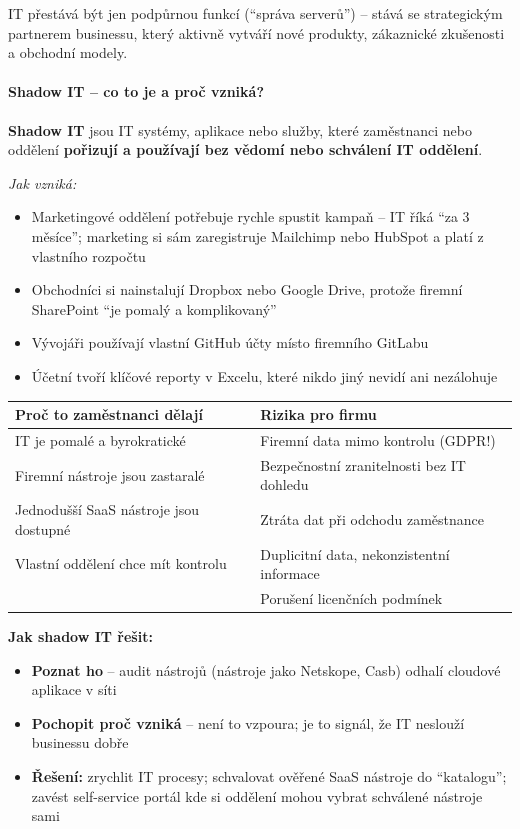 IT přestává být jen podpůrnou funkcí (``správa serverů'') -- stává se strategickým partnerem businessu,
který aktivně vytváří nové produkty, zákaznické zkušenosti a obchodní modely.

\paragraph{Shadow IT -- co to je a proč vzniká?}

\textbf{Shadow IT} jsou IT systémy, aplikace nebo služby, které zaměstnanci nebo oddělení
\textbf{pořizují a používají bez vědomí nebo schválení IT oddělení}.

\textit{Jak vzniká:}
\begin{itemize}
  \item Marketingové oddělení potřebuje rychle spustit kampaň -- IT říká ``za 3 měsíce'';
    marketing si sám zaregistruje Mailchimp nebo HubSpot a platí z vlastního rozpočtu
  \item Obchodníci si nainstalují Dropbox nebo Google Drive, protože firemní SharePoint
    ``je pomalý a komplikovaný''
  \item Vývojáři používají vlastní GitHub účty místo firemního GitLabu
  \item Účetní tvoří klíčové reporty v Excelu, které nikdo jiný nevidí ani nezálohuje
\end{itemize}

\begin{center}
\begin{tabular}{p{5.5cm}p{7cm}}
\toprule
\textbf{Proč to zaměstnanci dělají} & \textbf{Rizika pro firmu} \\
\midrule
IT je pomalé a byrokratické & Firemní data mimo kontrolu (GDPR!) \\
Firemní nástroje jsou zastaralé & Bezpečnostní zranitelnosti bez IT dohledu \\
Jednodušší SaaS nástroje jsou dostupné & Ztráta dat při odchodu zaměstnance \\
Vlastní oddělení chce mít kontrolu & Duplicitní data, nekonzistentní informace \\
& Porušení licenčních podmínek \\
\bottomrule
\end{tabular}
\end{center}

\textbf{Jak shadow IT řešit:}
\begin{itemize}
  \item \textbf{Poznat ho} -- audit nástrojů (nástroje jako Netskope, Casb) odhalí cloudové aplikace v síti
  \item \textbf{Pochopit proč vzniká} -- není to vzpoura; je to signál, že IT neslouží businessu dobře
  \item \textbf{Řešení:} zrychlit IT procesy; schvalovat ověřené SaaS nástroje do ``katalogu'';
    zavést self-service portál kde si oddělení mohou vybrat schválené nástroje sami
\end{itemize}

